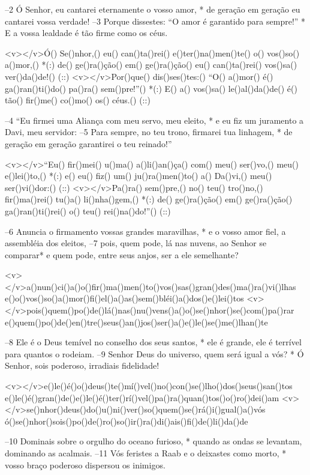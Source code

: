 –2 Ó Senhor, eu cantarei eternamente o vosso amor, *
de geração em geração eu cantarei vossa verdade!
–3 Porque dissestes: “O amor é garantido para sempre!” *
E a vossa lealdade é tão firme como os céus.

<v></v>Ó() Se()nhor,() eu() can()ta()rei() e()ter()na()men()te() o() vos()so() a()mor,() *(:)
de() ge()ra()ção() em() ge()ra()ção() eu() can()ta()rei() vos()sa() ver()da()de!() (::)
<v></v>Por()que() dis()ses()tes:() ``O() a()mor() é() ga()ran()ti()do() pa()ra() sem()pre!''() *(:)
E() a() vos()sa() le()al()da()de() é() tão() fir()me() co()mo() os() céus.() (::)

–4 “Eu firmei uma Aliança com meu servo, meu eleito, *
e eu fiz um juramento a Davi, meu servidor:
–5 Para sempre, no teu trono, firmarei tua linhagem, *
de geração em geração garantirei o teu reinado!”

<v></v>``Eu() fir()mei() u()ma() a()li()an()ça() com() meu() ser()vo,() meu() e()lei()to,() *(:)
e() eu() fiz() um() ju()ra()men()to() a() Da()vi,() meu() ser()vi()dor:() (::)
<v></v>Pa()ra() sem()pre,() no() teu() tro()no,() fir()ma()rei() tu()a() li()nha()gem,() *(:)
de() ge()ra()ção() em() ge()ra()ção() ga()ran()ti()rei() o() teu() rei()na()do!''() (::)

–6 Anuncia o firmamento vossas grandes maravilhas, *
e o vosso amor fiel, a assembléia dos eleitos,
–7 pois, quem pode, lá nas nuvens, ao Senhor se comparar*
e quem pode, entre seus anjos, ser a ele semelhante?

<v></v>a()nun()ci()a()o()fir()ma()men()to()vos()sas()gran()des()ma()ra()vi()lhas
e()o()vos()so()a()mor()fi()el()a()as()sem()bléi()a()dos()e()lei()tos
<v></v>pois()quem()po()de()lá()nas()nu()vens()a()o()se()nhor()se()com()pa()rar
e()quem()po()de()en()tre()seus()an()jos()ser()a()e()le()se()me()lhan()te

–8 Ele é o Deus temível no conselho dos seus santos, *
ele é grande, ele é terrível para quantos o rodeiam.
–9 Senhor Deus do universo, quem será igual a vós? *
Ó Senhor, sois poderoso, irradiais fidelidade!

<v></v>e()le()é()o()deus()te()mí()vel()no()con()se()lho()dos()seus()san()tos
e()le()é()gran()de()e()le()é()ter()rí()vel()pa()ra()quan()tos()o()ro()dei()am
<v></v>se()nhor()deus()do()u()ni()ver()so()quem()se()rá()i()gual()a()vós
ó()se()nhor()sois()po()de()ro()so()ir()ra()di()ais()fi()de()li()da()de

–10 Dominais sobre o orgulho do oceano furioso, *
quando as ondas se levantam, dominando as acalmais.
–11 Vós feristes a Raab e o deixastes como morto, *
vosso braço poderoso dispersou os inimigos.


